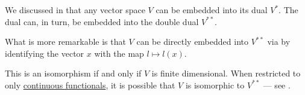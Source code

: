 \begin{remark}\label{rem:double_dual}
  We discussed in  that any vector space \( V \) can be embedded into its dual \( V^* \). The dual can, in turn, be embedded into the double dual \( V^{**} \).

  What is more remarkable is that \( V \) can be directly embedded into \( V^{**} \) via by identifying the vector \( x \) with the map \( l \mapsto l(x) \).

  This is an isomorphism if and only if \( V \) is finite dimensional. When restricted to only \hyperref[def:continuous_dual_space]{continuous functionals}, it is possible that \( V \) is isomorphic to \( V^{**} \) --- see .
\end{remark}
